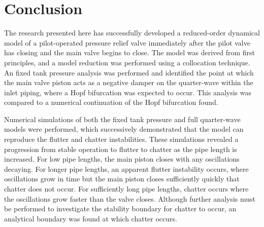 \chapter{Conclusion}

The research presented here has successfully developed a reduced-order dynamical model of a pilot-operated pressure relief valve immediately after the pilot valve has closing and the main valve begins to close. The model was derived from first principles, and a model reduction was performed using a collocation technique. An fixed tank pressure analysis was performed and identified the point at which the main valve piston acts as a negative damper on the quarter-wave within the inlet piping, where a Hopf bifurcation was expected to occur. This analysis was compared to a numerical continuation of the Hopf bifurcation found.

Numerical simulations of both the fixed tank pressure and full quarter-wave models were performed, which successively demonstrated that the model can reproduce the flutter and chatter instabilities. These simulations revealed a progression from stable operation to flutter to chatter as the pipe length is increased. For low pipe lengths, the main piston closes with any oscillations decaying. For longer pipe lengths, an apparent flutter instability occurs, where oscillations grow in time but the main piston closes sufficiently quickly that chatter does not occur. For sufficiently long pipe lengths, chatter occurs where the oscillations grow faster than the valve closes. Although further analysis must be performed to investigate the stability boundary for chatter to occur, an analytical boundary was found at which chatter occurs.